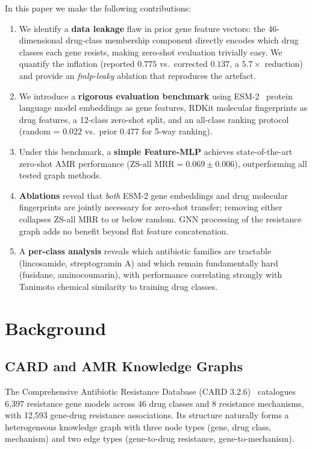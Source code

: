 \documentclass[conference]{IEEEtran}
\begin{document}
In this paper we make the following contributions:
\begin{enumerate}
  \item We identify a \textbf{data leakage} flaw in prior gene feature vectors:
    the 46-dimensional drug-class membership component directly encodes which
    drug classes each gene resists, making zero-shot evaluation trivially easy.
    We quantify the inflation (reported $0.775$ vs.\ corrected $0.137$,
    a $5.7\times$ reduction) and provide an \emph{fmlp-leaky} ablation that
    reproduces the artefact.
  \item We introduce a \textbf{rigorous evaluation benchmark} using
    ESM-2~\cite{lin2023esm2} protein language model embeddings as gene
    features, RDKit molecular fingerprints as drug features, a 12-class
    zero-shot split, and an all-class ranking protocol (random = $0.022$
    vs.\ prior $0.477$ for 5-way ranking).
  \item Under this benchmark, a \textbf{simple Feature-MLP} achieves
    state-of-the-art zero-shot AMR performance
    ($\text{ZS-all MRR}=0.069 \pm 0.006$), outperforming all tested graph
    methods.
  \item \textbf{Ablations} reveal that \emph{both} ESM-2 gene embeddings and
    drug molecular fingerprints are jointly necessary for zero-shot transfer;
    removing either collapses ZS-all MRR to or below random. GNN processing
    of the resistance graph adds no benefit beyond flat feature concatenation.
  \item A \textbf{per-class analysis} reveals which antibiotic families are
    tractable (lincosamide, streptogramin A) and which remain fundamentally
    hard (fusidane, aminocoumarin), with performance correlating strongly with
    Tanimoto chemical similarity to training drug classes.
\end{enumerate}

\section{Background}
\label{sec:background}

\subsection{CARD and AMR Knowledge Graphs}
The Comprehensive Antibiotic Resistance Database (CARD 3.2.6)~\cite{alcock2023card}
catalogues 6,397 resistance gene models across 46 drug classes and
8 resistance mechanisms, with 12,593 gene-drug resistance associations. Its
structure naturally forms a heterogeneous knowledge graph with three node
types (gene, drug class, mechanism) and two edge types (gene-to-drug
resistance, gene-to-mechanism).
\end{document}
